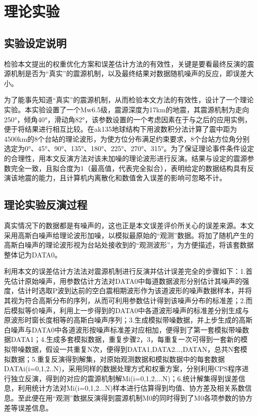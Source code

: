

\chapter{理论实验}

\section{实验设定说明}
检验本文提出的权重优化方案和误差估计方法的有效性，关键是要看最终反演的震源机制是否为“真实”的震源机制，以及最终结果对数据随机噪声的反应，即误差大小。

为了能事先知道“真实”的震源机制，从而检验本文方法的有效性，设计了一个理论实验。本实验设置了一个Mw6.5级，震源深度为17km的地震，其震源机制为走向250°，倾角40°，滑动角82°，该参数设置的一个考虑因素在于与之后的应用实例，便于将结果进行相互比较。在ak135地球结构\citep{Kennett1995}下用波数积分法计算了震中距为4500km的8个台站的理论波形，为使方位分布满足约束要求，8个台站方位角分别选定为0°、45°、90°、135°、180°、225°、270°、315°。为了保证理论事件条件设定的合理性，用本文反演方法对该未加噪的理论波形进行反演。结果与设定的震源参数完全一致，且拟合度为1（最高值，代表完全拟合），表明给定的数据结构具有反演该地震的能力，且计算机内离散化和数值舍入误差的影响可忽略不计。

\section{理论实验反演过程}
真实情况下的数据都是有噪声的，这也正是本文误差评价所关心的误差来源。本文采用高斯白噪声给理论波形加噪，以模拟最原始的“观测”数据。将加了随机产生的高斯白噪声的理论波形视为台站处接收到的“观测波形”，为方便描述，将该套数据整体记为DATA0。

利用本文的误差估计方法法对震源机制进行反演并估计误差完全的步骤如下：1.首先估计原始噪声，用参数估计方法对DATA0中每道数据波形分别估计其噪声的强度，估计时选取P波到达前的空白震相期波形作为该道波形的噪声数据样本，并将其视为符合高斯分布的序列，从而可利用参数估计得到该噪声分布的标准差；2.而后模拟等价噪声，利用上一步得到的DATA0中各道波形噪声的标准差分别生成与原波形时窗长度相等的高斯白噪声序列；3.生成模拟带噪数据，并上步生成的高斯白噪声与DATA0中各道波形按噪声标准差对应相加，便得到了第一套模拟带噪数据DATA1；4.生成多套模拟数据，重复步骤2，3，每重复一次可得到一套新的模拟带噪数据，假设一共重复N次，便得到DATA1,DATA2...,DATAN，总共N套模拟数据；5.重复反演得到解集，对原始观测数据和模拟数据中的每套数据DATAi(i=0,1,2..N)，采用同样的数据处理方式和权重方案，分别利用CPS程序进行独立反演，得到的对应的震源机制解Mi(i=0,1,2,...N)；6.统计解集得到误差信息，利用统计方法对Mi(i=0,1,2...N)样本进行估算得到均值、协方差及相关系数信息。至此便在用“观测”数据反演得到震源机制M0的同时得到了M0各项参数的协方差等误差信息。

